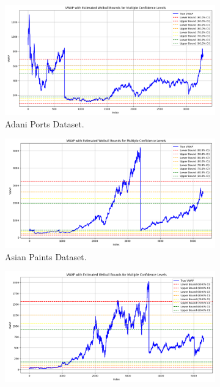 \begin{figure}[H]
    \centering
        \begin{minipage}{0.6\textwidth}
            \centering
            \begin{subfigure}[b]{0.8\textwidth}
                \centering
                \includegraphics[width=\textwidth]{Chap02/figs/Weibull_AdaniPorts.png}
                \caption{Adani Ports Dataset.}
            \end{subfigure}
            \hfill
            \begin{subfigure}[b]{0.8\textwidth}
                \centering
                \includegraphics[width=\textwidth]{Chap02/figs/Weibull_AsianPaints.png}
                \caption{Asian Paints Dataset.}
            \end{subfigure}
            \begin{subfigure}[b]{0.8\textwidth}
                \centering
                \includegraphics[width=\textwidth]{Chap02/figs/Weibull_AxisBank.png}

\end{subfigure}
\end{minipage}
\end{figure}
